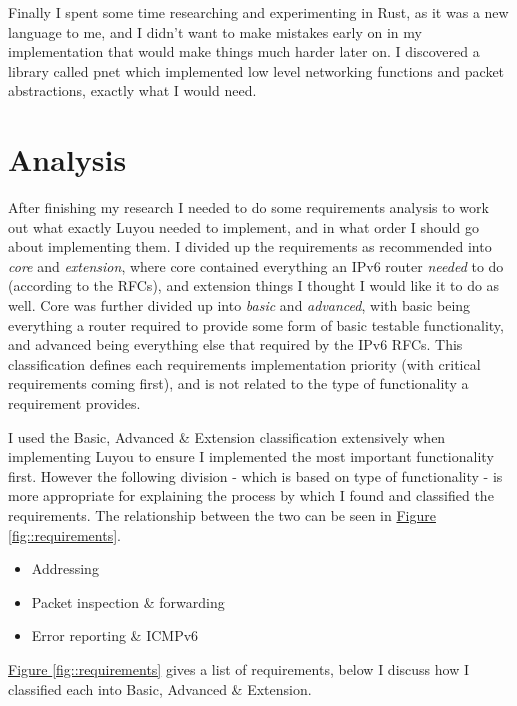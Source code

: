 \documentclass[12pt,a4paper,twoside,openany]{report}
\begin{document}
\bigskip

Finally I spent some time researching and experimenting in Rust\cite{rust}, as it was a new language to me, and I didn't want to make mistakes early on in my implementation that would make things much harder later on.  I discovered a library called pnet\cite{pnet_rust} which implemented low level networking functions and packet abstractions, exactly what I would need.

\section{Analysis}
\label{sec::analysis}

After finishing my research I needed to do some requirements analysis to work out what exactly Luyou needed to implement, and in what order I should go about implementing them.  I divided up the requirements as recommended into \textit{core} and \textit{extension}, where core contained everything an IPv6 router \textit{needed} to do (according to the RFCs), and extension things I thought I would like it to do as well.  Core was further divided up into \textit{basic} and \textit{advanced}, with basic being everything a router required to provide some form of basic testable functionality, and advanced being everything else that required by the IPv6 RFCs.  This classification defines each requirements implementation priority (with critical requirements coming first), and is not related to the type of functionality a requirement provides.

\bigskip

I used the Basic, Advanced \& Extension classification extensively when implementing Luyou to ensure I implemented the most important functionality first. However the following division - which is based on type of functionality - is more appropriate for explaining the process by which I found and classified the requirements. The relationship between the two can be seen in \hyperref[fig::requirements]{Figure }\ref{fig::requirements}.
\begin{itemize}
\item Addressing
\item Packet inspection \& forwarding
\item Error reporting \& ICMPv6\cite{icmpv6_rfc}
\end{itemize}
\hyperref[fig::requirements]{Figure }\ref{fig::requirements} gives a list of requirements, below I discuss how I classified each into Basic, Advanced \& Extension.
\end{document}
